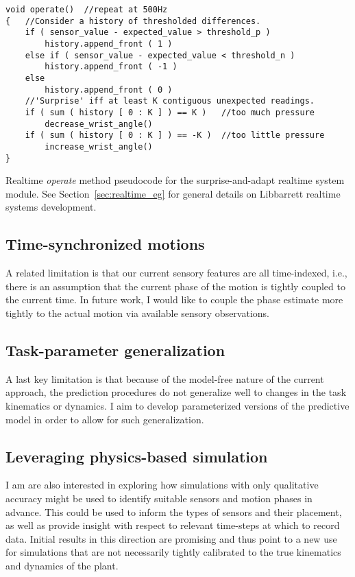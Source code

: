 \begin{Program}[width=0.5\linewidth]
\center
\begin{verbatim}
void operate()  //repeat at 500Hz
{   //Consider a history of thresholded differences.
    if ( sensor_value - expected_value > threshold_p )
        history.append_front ( 1 )
    else if ( sensor_value - expected_value < threshold_n )
        history.append_front ( -1 )
    else
        history.append_front ( 0 )
    //'Surprise' iff at least K contiguous unexpected readings.
    if ( sum ( history [ 0 : K ] ) == K )   //too much pressure
        decrease_wrist_angle()
    if ( sum ( history [ 0 : K ] ) == -K )  //too little pressure
        increase_wrist_angle()
}
\end{verbatim}
  \caption{Realtime \emph{operate} method pseudocode for the surprise-and-adapt realtime system module. See Section~\ref{sec:realtime_eg} for general details on Libbarrett realtime systems development.}
  \label{pgm:saa}
\end{Program}


\subsection*{Time-synchronized motions}

A related limitation is that our current sensory features are all time-indexed, i.e., there is an assumption that the current phase of the motion is tightly coupled to the current time.  In future work, I would like to couple the phase estimate more tightly to the actual motion via available sensory observations.

\subsection*{Task-parameter generalization}

A last key limitation is that because of the model-free nature of the current approach, the prediction procedures do not generalize well to changes in the task kinematics or dynamics. 
I aim to develop parameterized versions of the predictive model in order to allow for such generalization.

\subsection*{Leveraging physics-based simulation}

I am are also interested in exploring how simulations with only qualitative accuracy might be used to identify suitable sensors and motion phases in advance. This could be used to inform the types of sensors and their placement, as well as provide insight with respect to relevant time-steps at which to record data.  Initial results in this direction are promising and thus point to a new use for simulations that are not necessarily tightly calibrated to the true kinematics and dynamics of the plant.

